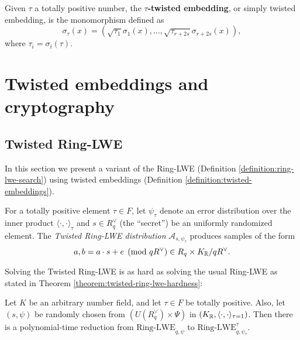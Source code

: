 \documentclass[a4paper,12pt]{article}
\begin{document}
\begin{definition}
  \label{definition:twisted-embeddings}
  Given $\tau$ a totally positive number, the \textbf{$\tau$-twisted embedding}, or
  simply twisted embedding, is the monomorphism defined as
  \begin{equation*}
    \sigma_\tau(x) = \left( \sqrt{\tau_1}\sigma_1(x), \dots, \sqrt{\tau_{r+2s}}\sigma_{r+2s}(x) \right),
  \end{equation*}
where $\tau_i = \sigma_i(\tau)$.
\end{definition}
\section{Twisted embeddings and cryptography}
\label{twisted-embeddings-and-cryptography}
\subsection{Twisted Ring-LWE}
\label{sec:org327f69c}
In this section we present a variant of the Ring-LWE (Definition \ref{definition:ring-lwe-search}) using twisted embeddings (Definition \ref{definition:twisted-embeddings}).

\begin{definition}
  \label{definition:twisted-ring-lwe}
  For a totally positive element $\tau \in F$, let $\psi_\tau$ denote an error distribution
  over the inner product $\langle{\cdot,\cdot}\rangle_\tau$ and $s \in R^\vee_q$ (the “secret”) be an
  uniformly randomized element. The \emph{Twisted Ring-LWE distribution}
  $\mathcal{A}_{s,\psi_\tau}$ produces samples of the form
  $$
  a, b = a \cdot s + e \pmod{qR^\vee} \in R_q \times K_{\mathbb{R}}/qR^\vee.
  $$
\end{definition}

Solving the Twisted Ring-LWE is as hard as solving the usual Ring-LWE as stated in Theorem \ref{theorem:twisted-ring-lwe-hardness}:

\begin{theorem}
  \label{theorem:twisted-ring-lwe-hardness}
  Let $K$ be an arbitrary number field, and let $\tau \in F$ be totally positive.
  Also, let $(s,\psi)$ be randomly chosen from $(U(R_q^\vee)\times \Psi)$ in $(K_{\mathbb{R}},\langle{\cdot,\cdot}\rangle_{\tau=1})$.
  Then there is a polynomial-time reduction from $\mbox{Ring-LWE}_{q,\psi}$ to $\mbox{Ring-LWE}^\tau_{q,\psi_\tau}$.
\end{theorem}
\end{document}
